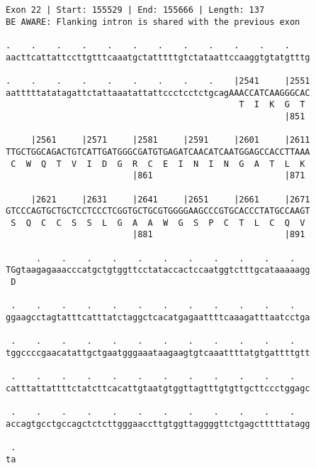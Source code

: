 \documentclass{article}
\begin{document}
\begin{Verbatim}
Exon 22 | Start: 155529 | End: 155666 | Length: 137
BE AWARE: Flanking intron is shared with the previous exon
 
.    .    .    .    .    .    .    .    .    .    .    .    
aacttcattattccttgtttcaaatgctatttttgtctataattccaaggtgtatgtttg
  
.    .    .    .    .    .    .    .    .    |2541     |2551
aatttttatatagattctattaaatattattccctcctctgcagAAACCATCAAGGGCAC
                                              T  I  K  G  T 
                                                       |851 
  
     |2561     |2571     |2581     |2591     |2601     |2611
TTGCTGGCAGACTGTCATTGATGGGCGATGTGAGATCAACATCAATGGAGCCACCTTAAA
 C  W  Q  T  V  I  D  G  R  C  E  I  N  I  N  G  A  T  L  K 
                         |861                          |871 
  
     |2621     |2631     |2641     |2651     |2661     |2671
GTCCCAGTGCTGCTCCTCCCTCGGTGCTGCGTGGGGAAGCCCGTGCACCCTATGCCAAGT
 S  Q  C  C  S  S  L  G  A  A  W  G  S  P  C  T  L  C  Q  V 
                         |881                          |891 
  
      .    .    .    .    .    .    .    .    .    .    .   
TGgtaagagaaacccatgctgtggttcctataccactccaatggtctttgcataaaaagg
 D                                                          
  
 .    .    .    .    .    .    .    .    .    .    .    .   
ggaagcctagtatttcatttatctaggctcacatgagaattttcaaagatttaatcctga
  
 .    .    .    .    .    .    .    .    .    .    .    .   
tggccccgaacatattgctgaatgggaaataagaagtgtcaaattttatgtgattttgtt
  
 .    .    .    .    .    .    .    .    .    .    .    .   
catttattattttctatcttcacattgtaatgtggttagtttgtgttgcttccctggagc
  
 .    .    .    .    .    .    .    .    .    .    .    .   
accagtgcctgccagctctcttgggaaccttgtggttaggggttctgagctttttatagg
  
 .
ta
\end{Verbatim}
\newpage
\end{document}

